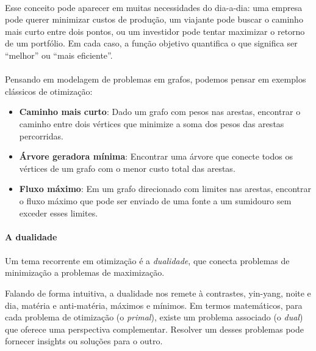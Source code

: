 \documentclass[12pt,a4paper]{article}
\begin{document}
\paragraph{}
Esse conceito pode aparecer em muitas necessidades do dia-a-dia: uma empresa pode querer minimizar custos de produção, um viajante pode buscar o caminho mais curto entre dois pontos, ou um investidor pode tentar maximizar o retorno de um portfólio. Em cada caso, a função objetivo quantifica o que significa ser “melhor” ou “mais eficiente”.

\paragraph{}
Pensando em modelagem de problemas em grafos, podemos pensar em exemplos clássicos de otimização:

\begin{itemize}
    \item \textbf{Caminho mais curto}: Dado um grafo com pesos nas arestas, encontrar o caminho entre dois vértices que minimize a soma dos pesos das arestas percorridas.
    \item \textbf{Árvore geradora mínima}: Encontrar uma árvore que conecte todos os vértices de um grafo com o menor custo total das arestas.
    \item \textbf{Fluxo máximo}: Em um grafo direcionado com limites nas arestas, encontrar o fluxo máximo que pode ser enviado de uma fonte a um sumidouro sem exceder esses limites.
\end{itemize}

\paragraph{A dualidade}

\paragraph{}
Um tema recorrente em otimização é a \emph{dualidade}, que conecta problemas de minimização a problemas de maximização. 

Falando de forma intuitiva, a dualidade nos remete à contrastes, yin-yang, noite e dia, matéria e anti-matéria, máximos e mínimos. Em termos matemáticos, para cada problema de otimização (o \emph{primal}), existe um problema associado (o \emph{dual}) que oferece uma perspectiva complementar. Resolver um desses problemas pode fornecer insights ou soluções para o outro.
\end{document}
